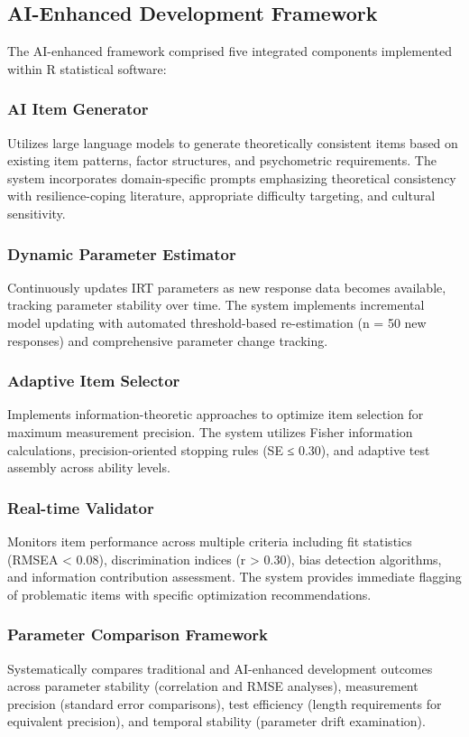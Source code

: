 \documentclass[12pt,a4paper]{article}
\begin{document}
\subsection{AI-Enhanced Development Framework}

The AI-enhanced framework comprised five integrated components implemented within R statistical software:

\subsubsection{AI Item Generator}
Utilizes large language models to generate theoretically consistent items based on existing item patterns, factor structures, and psychometric requirements. The system incorporates domain-specific prompts emphasizing theoretical consistency with resilience-coping literature, appropriate difficulty targeting, and cultural sensitivity.

\subsubsection{Dynamic Parameter Estimator}
Continuously updates IRT parameters as new response data becomes available, tracking parameter stability over time. The system implements incremental model updating with automated threshold-based re-estimation (n = 50 new responses) and comprehensive parameter change tracking.

\subsubsection{Adaptive Item Selector}
Implements information-theoretic approaches to optimize item selection for maximum measurement precision. The system utilizes Fisher information calculations, precision-oriented stopping rules (SE ≤ 0.30), and adaptive test assembly across ability levels.

\subsubsection{Real-time Validator}
Monitors item performance across multiple criteria including fit statistics (RMSEA < 0.08), discrimination indices (r > 0.30), bias detection algorithms, and information contribution assessment. The system provides immediate flagging of problematic items with specific optimization recommendations.

\subsubsection{Parameter Comparison Framework}
Systematically compares traditional and AI-enhanced development outcomes across parameter stability (correlation and RMSE analyses), measurement precision (standard error comparisons), test efficiency (length requirements for equivalent precision), and temporal stability (parameter drift examination).
\end{document}
